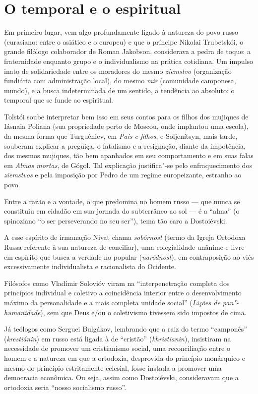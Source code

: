 \section{O temporal e o espiritual}

Em primeiro lugar, vem algo profundamente ligado à natureza do povo
russo (eurasiano: entre o asiático e o europeu) e que o príncipe Nikolai
Trubetskói, o grande filólogo colaborador de Roman Jakobson, considerava
a pedra de toque: a fraternidade enquanto grupo e o individualismo na
prática cotidiana. Um impulso inato de solidariedade entre os moradores
do mesmo \emph{ziemstvo} (organização fundiária com administração
local), do mesmo \emph{mir} (comunidade camponesa, mundo), e a busca indeterminada de um sentido, a tendência ao absoluto: o temporal que se funde ao espiritual.

Tolstói soube interpretar bem isso em seus contos para os filhos dos mujiques de Iásnaia Poliana (sua propriedade perto de Moscou, onde implantou uma escola), da mesma forma que Turguêniev, em \emph{Pais e filhos}, e Soljenítsyn, mais tarde, souberam explicar a preguiça, o fatalismo e a resignação, diante da impotência, dos mesmos mujiques, tão bem apanhados em seu comportamento e em suas falas em \emph{Almas mortas}, de Gógol. Tal explicação justifica"-se pelo enfraquecimento dos \emph{ziemstvos} e pela imposição por Pedro  de um regime europeizante, estranho ao povo.

Entre a razão e a vontade, o que predomina no homem russo --- que nunca se constituiu em cidadão em sua jornada do subterrâneo ao sol --- é a ``alma'' (o spinoziano ``o ser perseverando no seu ser''), tema tão caro a Dostoiévski.

A esse espírito de irmanação Nivat chama \emph{sobórnost} (termo da Igreja Ortodoxa Russa referente à sua natureza de conciliar), uma colegialidade unânime e livre em espírito que busca a verdade no popular (\emph{naródnost}), em contraposição ao viés excessivamente individualista e racionalista do Ocidente.

Filósofos como Vladímir Solovióv viram na ``interpenetração completa dos princípios individual e coletivo a coincidência interior entre o desenvolvimento máximo da personalidade e a mais completa unidade social'' (\emph{Lições de pan"-humanidade}), sem que Deus e/ou o coletivismo tivessem sido impostos de cima.

Já teólogos como Serguei Bulgákov, lembrando que a raiz do termo ``camponês'' (\emph{krestiánin}) em russo está ligada à de ``cristão'' (\emph{khristianin}), insistiram na necessidade de promover um cristianismo social, uma reconciliação entre o homem e a natureza em que a ortodoxia, desprovida do princípio monárquico e mesmo do princípio estritamente eclesial, fosse instada a promover uma democracia econômica. Ou seja, assim como Dostoiévski, consideravam que a ortodoxia seria ``nosso socialismo russo''.

